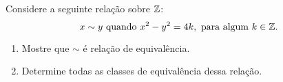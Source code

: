 \documentclass[12pt]{exam}
\begin{document}
    \questao{} Considere a seguinte relação sobre $\mathbb{Z}$:
    \[
    x \sim y \mbox{ quando }  x^2 - y^2 = 4k, \mbox{ para algum } k \in \mathbb{Z}.
    \]

    \begin{enumerate}[label={\alph*})]
        \item Mostre que $\sim$ é relação de equivalência.

        \item Determine todas as classes de equivalência dessa relação.
    \end{enumerate}
\end{document}
